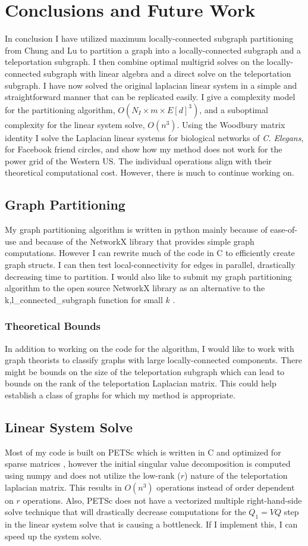 \documentclass{article}
\begin{document}
\chapter{Conclusions and Future Work}
In conclusion I have utilized maximum locally-connected subgraph partitioning from Chung and Lu to partition a graph into a locally-connected subgraph and a teleportation subgraph. I then combine optimal multigrid solves on the locally-connected subgraph with linear algebra and a direct solve on the teleportation subgraph. I have now solved the original laplacian linear system in a simple and straightforward manner that can be replicated easily. I give a complexity model for the partitioning algorithm, $O(N_I \times m \times E[d]^3)$, and a suboptimal complexity for the linear system solve, $O(n^3)$. Using the Woodbury matrix identity \cite{Woodbury:1950} I solve the Laplacian linear systems for biological networks of \textit{C. Elegans}, for Facebook friend circles, and show how my method does not work for the power grid of the Western US. The individual operations align with their theoretical computational cost. However, there is much to continue working on.

\section{Graph Partitioning}
My graph partitioning algorithm is written in python mainly because of ease-of-use and because of the NetworkX library that provides simple graph computations. However I can rewrite much of the code in C to efficiently create graph structs. I can then test local-connectivity for edges in parallel, drastically decreasing time to partition. I would also like to submit my graph partitioning algorithm to the open source NetworkX library as an alternative to the k,l\_connected\_subgraph function for small $k$ \cite{Hagberg:2008}.
\subsection{Theoretical Bounds}
In addition to working on the code for the algorithm, I would like to work with graph theorists to classify graphs with large locally-connected components. There might be bounds on the size of the teleportation subgraph which can lead to bounds on the rank of the teleportation Laplacian matrix. This could help establish a class of graphs for which my method is appropriate.

\section{Linear System Solve}
Most of my code is built on PETSc which is written in C and optimized for sparse matrices \cite{petsc-user-ref}, however the initial singular value decomposition is computed using numpy \cite{numpy} and does not utilize the low-rank ($r$) nature of the teleportation laplacian matrix. This results in $O(n^3)$ operations instead of order dependent on $r$ operations. Also, PETSc does not have a vectorized multiple right-hand-side solve technique that will drastically decrease computations for the $Q_1 = VQ$ step in the linear system solve that is causing a bottleneck. If I implement this, I can speed up the system solve.
\end{document}
